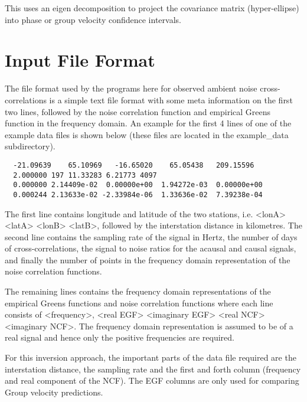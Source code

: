 \documentclass{article}
\begin{document}
This uses an eigen decomposition to project the covariance matrix
(hyper-ellipse) into phase or group velocity confidence intervals.

\appendix
  
\section{Input File Format}

The file format used by the programs here for observed ambient noise
cross-correlations is a simple text file format with some meta
information on the first two lines, followed by the noise correlation
function and empirical Greens function in the frequency domain.  An
example for the first 4 lines of one of the example data files is
shown below (these files are located in the example\_data
subdirectory).

\begin{verbatim}
  -21.09639    65.10969   -16.65020    65.05438   209.15596
  2.000000 197 11.33283 6.21773 4097
  0.000000 2.14409e-02  0.00000e+00  1.94272e-03  0.00000e+00
  0.000244 2.13633e-02 -2.33984e-06  1.33636e-02  7.39238e-04
\end{verbatim}

The first line contains longitude and latitude of the two stations,
i.e. <lonA> <latA> <lonB> <latB>, followed by the interstation
distance in kilometres. The second line contains the sampling rate of
the signal in Hertz, the number of days of cross-correlations, the
signal to noise ratios for the acausal and causal signals, and finally
the number of points in the frequency domain representation of the
noise correlation functions.

The remaining lines contains the frequency domain representations of
the empirical Greens functions and noise correlation functions where
each line consists of <frequency>, <real EGF> <imaginary EGF> <real
NCF> <imaginary NCF>. The frequency domain representation is assumed
to be of a real signal and hence only the positive frequencies are
required.

For this inversion approach, the important parts of the data file
required are the interstation distance, the sampling rate and the
first and forth column (frequency and real component of the NCF). The
EGF columns are only used for comparing Group velocity predictions.
\end{document}
